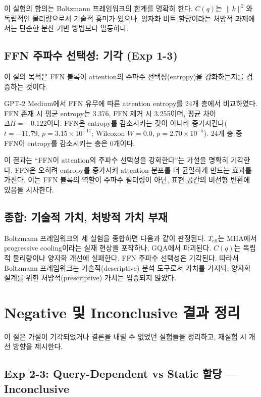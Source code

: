 \documentclass[11pt,a4paper]{article}
\newcommand{\teff}{T_\mathrm{eff}}
\newcommand{\Cq}{C(q)}
\newcommand{\knorm}{\|k\|^2}
\begin{document}
이 실험의 함의는 Boltzmann 프레임워크의 한계를 명확히 한다.
$\Cq$는 $\knorm$와 독립적인 물리량으로서 기술적 흥미가 있으나, 양자화 비트 할당이라는 처방적 과제에서는 단순한 분산 기반 방법보다 열등하다.

\subsection{FFN 주파수 선택성: 기각 (Exp 1-3)}
\label{sec:exp13}

이 절의 목적은 FFN 블록이 attention의 주파수 선택성(entropy)을 강화하는지를 검증하는 것이다.

GPT-2 Medium에서 FFN 유무에 따른 attention entropy를 24개 층에서 비교하였다.
FFN 존재 시 평균 entropy는 3.376, FFN 제거 시 3.255이며, 평균 차이 $\Delta H = -0.122$이다.
FFN은 entropy를 감소시키는 것이 아니라 증가시킨다($t = -11.79$, $p = 3.15 \times 10^{-11}$; Wilcoxon $W = 0.0$, $p = 2.70 \times 10^{-5}$).
24개 층 중 FFN이 entropy를 감소시키는 층은 0개이다.

이 결과는 ``FFN이 attention의 주파수 선택성을 강화한다''는 가설을 명확히 기각한다.
FFN은 오히려 entropy를 증가시켜 attention 분포를 더 균일하게 만드는 효과를 가진다.
이는 FFN 블록의 역할이 주파수 필터링이 아닌, 표현 공간의 비선형 변환에 있음을 시사한다.

\subsection{종합: 기술적 가치, 처방적 가치 부재}

Boltzmann 프레임워크의 세 실험을 종합하면 다음과 같이 판정된다.
$\teff$는 MHA에서 progressive cooling이라는 실재 현상을 포착하나, GQA에서 파괴된다.
$\Cq$는 독립적 물리량이나 양자화 개선에 실패한다.
FFN 주파수 선택성은 기각된다.
따라서 Boltzmann 프레임워크는 기술적(descriptive) 분석 도구로서 가치를 가지되, 양자화 설계를 위한 처방적(prescriptive) 가치는 입증되지 않았다.

\section{Negative 및 Inconclusive 결과 정리}

이 절은 가설이 기각되었거나 결론을 내릴 수 없었던 실험들을 정리하고, 재실험 시 개선 방향을 제시한다.

\subsection{Exp 2-3: Query-Dependent vs Static 할당 --- Inconclusive}
\label{sec:exp23}
\end{document}
